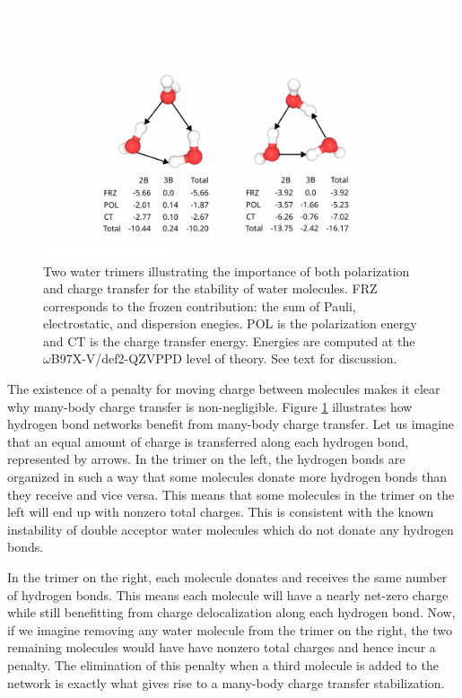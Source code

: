 \documentclass[journal=jacsat,manuscript=article]{achemso}
\begin{document}
\begin{figure}[H]
  \includegraphics*[width=\textwidth]{figures/trimer_mbe_example.png}
  \caption{Two water trimers illustrating the importance of both polarization
  and charge transfer for the stability of water molecules. FRZ corresponds to
  the frozen contribution: the sum of Pauli, electrostatic, and dispersion enegies. POL is the polarization
  energy and CT is the charge transfer energy. Energies are computed at the
  $\omega$B97X-V/def2-QZVPPD level of theory. See text for discussion.}
  \label{fig:trimer}
\end{figure}

The existence of a penalty for moving charge between molecules makes it clear
why many-body charge transfer is non-negligible. Figure \ref{fig:trimer} illustrates
how hydrogen bond networks benefit from many-body charge transfer. Let us imagine that
an equal amount of charge is transferred along each hydrogen bond, represented by arrows. 
In the trimer on the left, the hydrogen bonds are organized in such a way that some molecules
donate more hydrogen bonds than they receive and vice versa. This means that some molecules
in the trimer on the left will end up with nonzero total charges. This is consistent
with the known instability of double acceptor water molecules which do not donate
any hydrogen bonds.\cite{kirov2008identifying}

In the trimer on the right, each molecule donates and receives the same number of hydrogen bonds.
This means each molecule will have a nearly net-zero charge while still
benefitting from charge delocalization along each hydrogen bond. Now, if we imagine
removing any water molecule from the trimer on the right, the two remaining molecules would have
have nonzero total charges and hence incur a penalty. The elimination of this penalty
when a third molecule is added to the network is exactly what gives rise to a many-body charge transfer stabilization.
\end{document}
